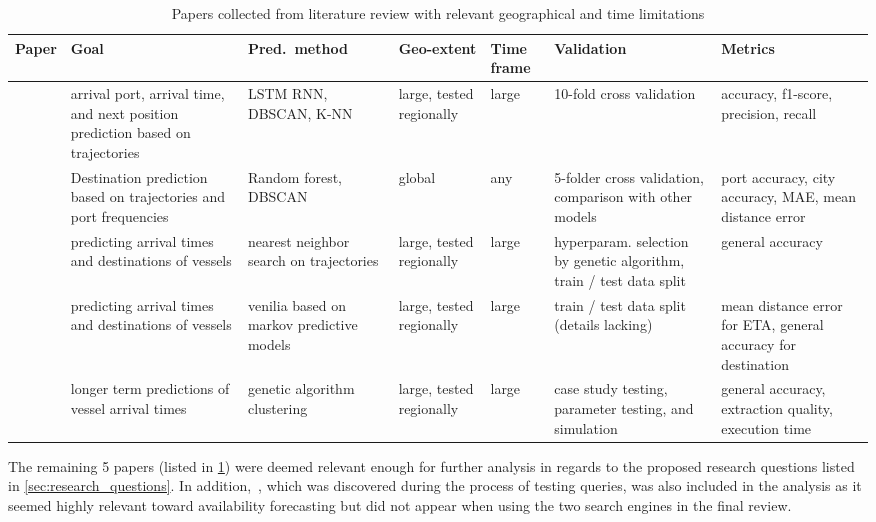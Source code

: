 \begin{table}[htbp]
    \centering
    \begin{tabular}{p{0.6in} p{0.8in} p{0.75in} p{0.6in} p{0.5in} p{0.8in} p{0.8in}}
    \hline
    \bfseries{Paper} & \bfseries{Goal} & \bfseries{Pred.\ method} & \bfseries{Geo-extent} & \bfseries{Time frame} & \bfseries{Validation} & \bfseries{Metrics} \\ \hline
        \cite{Karatas2020TrajectoryData} & arrival port, arrival time, and next position prediction based on trajectories & LSTM RNN, DBSCAN, K-NN & large, tested regionally & large & 10-fold cross validation & accuracy, f1-score, precision, recall \\ \hline
        \cite{Zhang2020AISApproach} & Destination prediction based on trajectories and port frequencies & Random forest, DBSCAN & global & any & 5-folder cross validation, comparison with other models & port accuracy, city accuracy, MAE, mean distance error \\ \hline
        \cite{Rosca2018GrandRoutes} & predicting arrival times and destinations of vessels & nearest neighbor search on trajectories & large, tested regionally & large & hyperparam. selection by genetic algorithm, train / test data split & general accuracy \\ \hline
        \cite{Bachar2018GrandDestination} & predicting arrival times and destinations of vessels & venilia based on markov predictive models & large, tested regionally & large & train / test data split (details lacking) & mean distance error for ETA, general accuracy for destination \\ \hline
        \cite{Dobrkovic2018MaritimeData} & longer term predictions of vessel arrival times & genetic algorithm clustering & large, tested regionally & large & case study testing, parameter testing, and simulation & general accuracy, extraction quality, execution time \\ \hline
    \end{tabular}
\caption{Papers collected from literature review with relevant geographical and time limitations}\label{tab:most_relevant_papers}
\end{table}

The remaining \textbf{}5 papers (listed in \cref{tab:most_relevant_papers}) were deemed relevant enough for further analysis in regards to the proposed research questions listed in \cref{sec:research_questions}. In addition,~\cite{lechtenberg2019}, which was discovered during the process of testing queries, was also included in the analysis as it seemed highly relevant toward availability forecasting but did not appear when using the two search engines in the final review.

